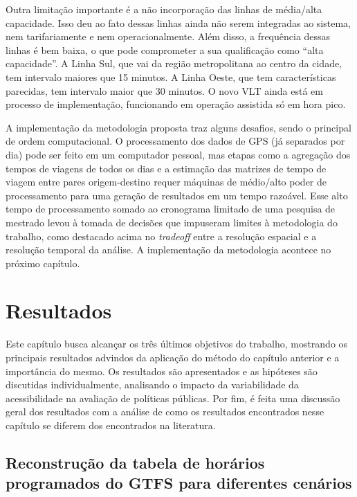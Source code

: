 \documentclass[        
    a4paper,          %
    12pt,             %
    chapter=TITLE,    %
    section=Title,    %
    subsection=Title, %
    oneside,          %
    english,          %
    spanish,          %
    brazil,           %
    fleqn             %
]{abntex2}
\begin{document}
  Outra limitação importante é a não incorporação das linhas de média/alta capacidade. Isso deu ao fato dessas linhas ainda não serem integradas ao sistema, nem tarifariamente e nem operacionalmente. Além disso, a frequência dessas linhas é bem baixa, o que pode comprometer a sua qualificação como ``alta capacidade''. A Linha Sul, que vai da região metropolitana ao centro da cidade, tem intervalo maiores que 15 minutos. A Linha Oeste, que tem características parecidas, tem intervalo maior que 30 minutos. O novo VLT ainda está em processo de implementação, funcionando em operação assistida só em hora pico.
  
  A implementação da metodologia proposta traz alguns desafios, sendo o principal de ordem computacional. O processamento dos dados de GPS (já separados por dia) pode ser feito em um computador pessoal, mas etapas como a agregação dos tempos de viagens de todos os dias e a estimação das matrizes de tempo de viagem entre pares origem-destino requer máquinas de médio/alto poder de processamento para uma geração de resultados em um tempo razoável. Esse alto tempo de processamento somado ao cronograma limitado de uma pesquisa de mestrado levou à tomada de decisões que impuseram limites à metodologia do trabalho, como destacado acima no \emph{tradeoff} entre a resolução espacial e a resolução temporal da análise. A implementação da metodologia acontece no próximo capítulo.
  
  \hypertarget{resultados-1}{%
  \chapter{Resultados}\label{resultados-1}}
  
  Este capítulo busca alcançar os três últimos objetivos do trabalho, mostrando os principais resultados advindos da aplicação do método do capítulo anterior e a importância do mesmo. Os resultados são apresentados e as hipóteses são discutidas individualmente, analisando o impacto da variabilidade da acessibilidade na avaliação de políticas públicas. Por fim, é feita uma discussão geral dos resultados com a análise de como os resultados encontrados nesse capítulo se diferem dos encontrados na literatura.
  
  \hypertarget{reconstrucao-da-tabela-de-horarios-programados-do-gtfs-para-diferentes-cenarios-1}{%
  \section{Reconstrução da tabela de horários programados do GTFS para diferentes cenários}\label{reconstrucao-da-tabela-de-horarios-programados-do-gtfs-para-diferentes-cenarios-1}}
  
\end{document}
